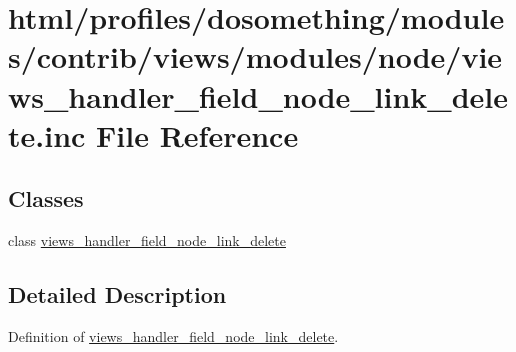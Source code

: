 \hypertarget{views__handler__field__node__link__delete_8inc}{
\section{html/profiles/dosomething/modules/contrib/views/modules/node/views\_\-handler\_\-field\_\-node\_\-link\_\-delete.inc File Reference}
\label{views__handler__field__node__link__delete_8inc}
}
\subsection*{Classes}
\begin{DoxyCompactItemize}
\item 
class \hyperlink{classviews__handler__field__node__link__delete}{views\_\-handler\_\-field\_\-node\_\-link\_\-delete}
\end{DoxyCompactItemize}


\subsection{Detailed Description}
Definition of \hyperlink{classviews__handler__field__node__link__delete}{views\_\-handler\_\-field\_\-node\_\-link\_\-delete}. 